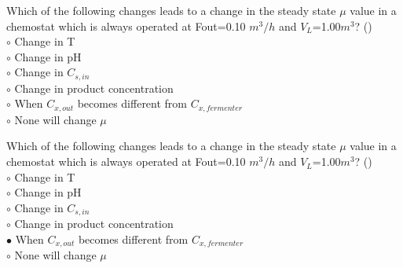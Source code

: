 \documentclass[]{beamer}
\begin{document}
\begin{frame}[shrink] {}
\addtocounter{questions}{1}
\color{blue}
Which of the following changes leads to a change in the steady state $\mu$ value in a chemostat which is always operated at Fout=0.10 $m^{3}/h$ and $V_L$=1.00$m^3$? ()\\
\color{black}
\setlength{\parindent}{-0.4cm}
{\color{red}$\circ$} Change in T\\
{\color{red}$\circ$} Change in pH\\
{\color{red}$\circ$} Change in $C_{s,in}$ \\
{\color{red}$\circ$} Change in product concentration\\
{\color{red}$\circ$} When $C_{x,out}$ becomes different from $C_{x,fermenter}$ \\
{\color{red}$\circ$} None will change $\mu$\\
\end{frame}
\begin{frame}[shrink] {}
\addtocounter{answers}{1}
\color{blue}
Which of the following changes leads to a change in the steady state $\mu$ value in a chemostat which is always operated at Fout=0.10 $m^{3}/h$ and $V_L$=1.00$m^3$? ()\\
\color{black}
\setlength{\parindent}{-0.4cm}
{\color{red}$\circ$} Change in T\\
{\color{red}$\circ$} Change in pH\\
{\color{red}$\circ$} Change in $C_{s,in}$ \\
{\color{red}$\circ$} Change in product concentration\\
{\color{red}$\bullet$} When $C_{x,out}$ becomes different from $C_{x,fermenter}$ \\
{\color{red}$\circ$} None will change $\mu$\\
\end{frame}
\end{document}
